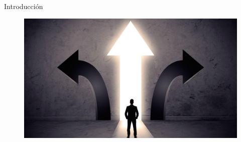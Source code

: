 \begin{frame}[t]{Introducci\'on}\vspace{10pt}

\begin{figure}
	\centering
	\includegraphics[scale=0.2]{Images/decision.jpg}
\end{figure}

\end{frame}